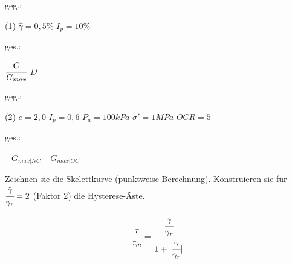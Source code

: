 \documentclass[12pt]{exam}
\begin{document}
\begin{questions}
  \vspace{1em}

     \begin{minipage}[t]{.49\linewidth}
    geg.:
    \begin{tasks}(1)
      \task[] $\hat\gamma = 0,5\%$
      \task[] $I_p = 10 \%$
    \end{tasks}
    \end{minipage}
    \begin{minipage}[t]{.49\linewidth}
    ges.:
        \begin{tasks}
            \task $\cfrac{G}{G_{max}}$
            \task $D$
        \end{tasks}
    \end{minipage}

    \begin{center}\end{center}

\vspace{1cm}

  \vspace{1em}

     \begin{minipage}[t]{.49\linewidth}
    geg.:
    \begin{tasks}(2)
      \task[] $e = 2,0$
    \task[] $I_p = 0,6$
    \task[] $P_a = 100 kPa$
    \task[] $\bar \sigma' = 1 MPa$
    \task[] $OCR = 5$
    \end{tasks}
    \end{minipage}
    \begin{minipage}[t]{.49\linewidth}
    ges.:
        \begin{tasks}
            \task $- G_{max|NC}$
            \task $- G_{max|OC}$
        \end{tasks}
    \end{minipage}
 \begin{center}\end{center}

 \vspace{1em}
 \begin{tasks}
 \task Zeichnen sie die Skelettkurve (punktweise Berechnung).
\task Konstruieren sie für $\cfrac{\hat \gamma}{\gamma_r}=2$ (Faktor 2) die Hysterese-Äste.
 \end{tasks}
 \begin{align*}
 \cfrac{\tau}{\tau_m} = \cfrac{\cfrac{\gamma}{\gamma_r}}{1+|\cfrac{\gamma}{\gamma_r}|}
 \end{align*}
    \begin{figure}[!h]
        \centering
        
        \label{fig:Skelettkurve}
        \vfill
    \end{figure}


\end{questions}
\end{document}

